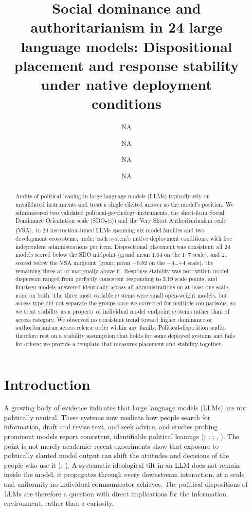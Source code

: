 \documentclass[
]{article}
\title{Social dominance and authoritarianism in 24 large language
models: Dispositional placement and response stability under native
deployment conditions}
\author{NA \and NA \and NA \and NA}
\date{}
\newcounter{none} %
\begin{document}
\maketitle
\begin{abstract}
Audits of political leaning in large language models (LLMs) typically
rely on unvalidated instruments and treat a single elicited answer as
the model's position. We administered two validated political-psychology
instruments, the short-form Social Dominance Orientation scale
(SDO\textsubscript{7}(s)) and the Very Short Authoritarianism scale
(VSA), to 24 instruction-tuned LLMs spanning six model families and two
development ecosystems, under each system's native deployment
conditions, with five independent administrations per item.
Dispositional placement was consistent: all 24 models scored below the
SDO midpoint (grand mean 1.64 on the 1--7 scale), and 21 scored below
the VSA midpoint (grand mean −0.82 on the −4\ldots+4 scale), the
remaining three at or marginally above it. Response stability was not:
within-model dispersion ranged from perfectly consistent responding to
2.19 scale points, and fourteen models answered identically across all
administrations on at least one scale, none on both. The three most
variable systems were small open-weight models, but access type did not
separate the groups once we corrected for multiple comparisons, so we
treat stability as a property of individual model--endpoint systems
rather than of access category. We observed no consistent trend toward
higher dominance or authoritarianism across release order within any
family. Political-disposition audits therefore rest on a stability
assumption that holds for some deployed systems and fails for others; we
provide a template that measures placement and stability together.
\end{abstract}


\section{Introduction}\label{introduction}

A growing body of evidence indicates that large language models (LLMs)
are not politically neutral. These systems now mediate how people search
for information, draft and revise text, and seek advice, and studies
probing prominent models report consistent, identifiable political
leanings (;
;
;
,
). The point is not merely academic:
recent experiments show that exposure to politically slanted model
output can shift the attitudes and decisions of the people who use it
(;
). A systematic
ideological tilt in an LLM does not remain inside the model, it
propagates through every downstream interaction, at a scale and
uniformity no individual communicator achieves. The political
dispositions of LLMs are therefore a question with direct implications
for the information environment, rather than a curiosity.
\end{document}
